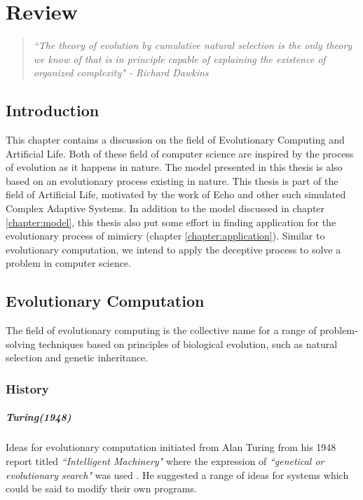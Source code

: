 \chapter{Review}
\label{chapter:review}
\begin{quote}
\textsl{``The theory of evolution by cumulative natural selection is the only theory we know of that is in principle capable of explaining the existence of organized complexity" - Richard Dawkins \cite{dawkins1996}}
\end{quote}

\section{Introduction}
This chapter contains a discussion on the field of Evolutionary Computing and Artificial Life. Both of these field of computer science are inspired by the process of evolution as it happens in nature. The model presented in this thesis is also based on an evolutionary process existing in nature. This thesis is part of the field of Artificial Life, motivated by the work of Echo \cite{holland1996} and other such simulated Complex Adaptive Systems. In addition to the model discussed in chapter \ref{chapter:model}, this thesis also put some effort in finding application for the evolutionary process of mimicry (chapter \ref{chapter:application}). Similar to evolutionary computation, we intend to apply the deceptive process to solve a problem in computer science.

\section{Evolutionary Computation}
The field of evolutionary computing is the collective name for a range of problem-solving techniques based on principles of biological evolution, such as natural selection and genetic inheritance. 

\subsection{History}
\label{subsec:evo-comp-history}

\paragraph{Turing(1948)}
Ideas for evolutionary computation initiated from Alan Turing from his 1948 report titled \textsl{``Intelligent Machinery"} where the expression of \textsl{``genetical or evolutionary search"}  was used \cite{turing1948}. He suggested a range of ideas for systems which could be said to modify their own programs. 

